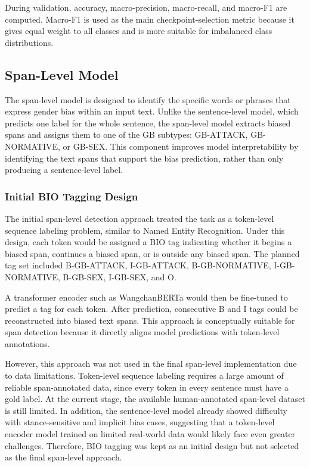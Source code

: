 \documentclass[12pt,oneside,openright,a4paper]{cpe-english-project}
\begin{document}
During validation, accuracy, macro-precision, macro-recall, and macro-F1 are computed. Macro-F1 is used as the main checkpoint-selection metric because it gives equal weight to all classes and is more suitable for imbalanced class distributions.

\subsection{Span-Level Model}

The span-level model is designed to identify the specific words or phrases that express gender bias within an input text. Unlike the sentence-level model, which predicts one label for the whole sentence, the span-level model extracts biased spans and assigns them to one of the GB subtypes: GB-ATTACK, GB-NORMATIVE, or GB-SEX. This component improves model interpretability by identifying the text spans that support the bias prediction, rather than only producing a sentence-level label.

\subsubsection{Initial BIO Tagging Design}

The initial span-level detection approach treated the task as a token-level sequence labeling problem, similar to Named Entity Recognition. Under this design, each token would be assigned a BIO tag indicating whether it begins a biased span, continues a biased span, or is outside any biased span. The planned tag set included B-GB-ATTACK, I-GB-ATTACK, B-GB-NORMATIVE, I-GB-NORMATIVE, B-GB-SEX, I-GB-SEX, and O.

A transformer encoder such as WangchanBERTa would then be fine-tuned to predict a tag for each token. After prediction, consecutive B and I tags could be reconstructed into biased text spans. This approach is conceptually suitable for span detection because it directly aligns model predictions with token-level annotations.

However, this approach was not used in the final span-level implementation due to data limitations. Token-level sequence labeling requires a large amount of reliable span-annotated data, since every token in every sentence must have a gold label. At the current stage, the available human-annotated span-level dataset is still limited. In addition, the sentence-level model already showed difficulty with stance-sensitive and implicit bias cases, suggesting that a token-level encoder model trained on limited real-world data would likely face even greater challenges. Therefore, BIO tagging was kept as an initial design but not selected as the final span-level approach.
\end{document}
